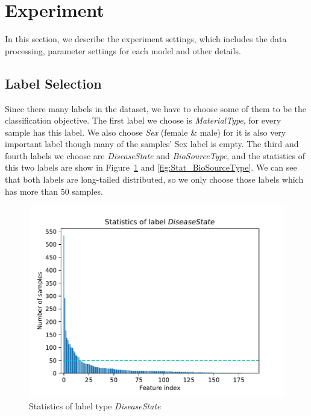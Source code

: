 \documentclass[sigconf]{acmart}
\begin{document}
	\section{Experiment}
	In this section, we describe the experiment settings, which includes the data processing, parameter settings for each model and other details.
	
	\subsection{Label Selection}
	Since there many labels in the dataset, we have to choose some of them to be the classification objective. The first label we choose is \textit{MaterialType}, for every sample has this label. We also choose \textit{Sex} (female \& male) for it is also very important label though many of the samples' Sex label is empty. The third and fourth labels we choose are \textit{DiseaseState} and \textit{BioSourceType}, and the statistics of this two labels are show in Figure~\ref{fig:Stat_DiseaseState} and \ref{fig:Stat_BioSourceType}. We can see that both labels are long-tailed distributed, so we only choose those labels which has more than 50 samples. 
	
	\begin{figure}[h]
	\centering
	\includegraphics[width=0.8\linewidth]{../figs/Stat_DiseaseState}
	\caption{Statistics of label type \textit{DiseaseState}}
	\label{fig:Stat_DiseaseState}
	\end{figure}
	
\end{document}
